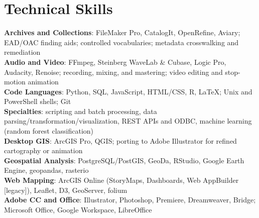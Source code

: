 \documentclass[letterpaper,10pt]{article}
\begin{document}
\section{Technical Skills}
 \begin{itemize}[leftmargin=0.15in, label={}]
    \small{\item{
     \textbf{Archives and Collections}{: FileMaker Pro, CatalogIt, OpenRefine, Aviary; EAD/OAC finding aids; controlled vocabularies; metadata crosswalking and remediation} \\
     \textbf{Audio and Video}{: FFmpeg, Steinberg WaveLab \& Cubase, Logic Pro, Audacity, Renoise; recording, mixing, and mastering; video editing and stop-motion animation} \\
     \textbf{Code Languages}{: Python, SQL, JavaScript, HTML/CSS, R, \LaTeX; Unix and PowerShell shells; Git} \\
     \textbf{\hspace{0.15in}Specialties}{: scripting and batch processing, data parsing/transformation/visualization, REST APIs and ODBC, machine learning (random forest classification)} \\
     \textbf{Desktop GIS}{: ArcGIS Pro, QGIS; porting to Adobe Illustrator for refined cartography or animation} \\
     \textbf{Geospatial Analysis}{: PostgreSQL/PostGIS, GeoDa, RStudio, Google Earth Engine, geopandas, rasterio} \\
     \textbf{Web Mapping}{: ArcGIS Online (StoryMaps, Dashboards, Web AppBuilder [legacy]), Leaflet, D3, GeoServer, folium} \\
     \textbf{Adobe CC and Office}{: Illustrator, Photoshop, Premiere, Dreamweaver, Bridge; Microsoft Office, Google Workspace, LibreOffice}
    }}
 \end{itemize}


\end{document}

